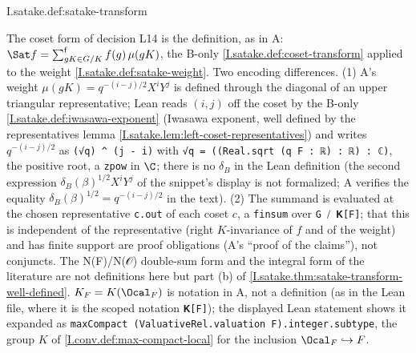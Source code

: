 \begin{definition}
\end{definition}
\begin{tfformal}{I.satake.def:satake-transform}
\begin{tffidelity}
The coset form of decision L14 is the definition, as in A: $\Sat f=\sum^{\mathrm f}_{gK\in G/K}f(g)\,\mu(gK)$, the B-only \cref{I.satake.def:coset-transform} applied to the weight \cref{I.satake.def:satake-weight}. Two encoding differences. (1) A's weight $\mu(gK)=q^{-(i-j)/2}X^iY^j$ is defined through the diagonal of an upper triangular representative; Lean reads $(i,j)$ off the coset by the B-only \cref{I.satake.def:iwasawa-exponent} (Iwasawa exponent, well defined by the representatives lemma \cref{I.satake.lem:left-coset-representatives}) and writes $q^{-(i-j)/2}$ as \texttt{(√q) \^{} (j - i)} with \texttt{√q = ((Real.sqrt (q F : ℝ) : ℝ) : ℂ)}, the positive root, a \texttt{zpow} in $\C$; there is no $\delta_B$ in the Lean definition (the second expression $\delta_B(\beta)^{1/2}X^iY^j$ of the snippet's display is not formalized; A verifies the equality $\delta_B(\beta)^{1/2}=q^{-(i-j)/2}$ in the text). (2) The summand is evaluated at the chosen representative \texttt{c.out} of each coset $c$, a \texttt{finsum} over \texttt{G ⧸ 𝐊[F]}; that this is independent of the representative (right $K$-invariance of $f$ and of the weight) and has finite support are proof obligations (A's ``proof of the claims''), not conjuncts. The N(F)/N(𝒪) double-sum form and the integral form of the literature are not definitions here but part (b) of \cref{I.satake.thm:satake-transform-well-defined}. $K_F=K(\Ocal_F)$ is notation in A, not a definition (as in the Lean file, where it is the scoped notation \texttt{𝐊[F]}); the displayed Lean statement shows it expanded as \texttt{maxCompact (ValuativeRel.valuation F).integer.subtype}, the group $K$ of \cref{I.conv.def:max-compact-local} for the inclusion $\Ocal_F\hookrightarrow F$.
\end{tffidelity}
\end{tfformal}

